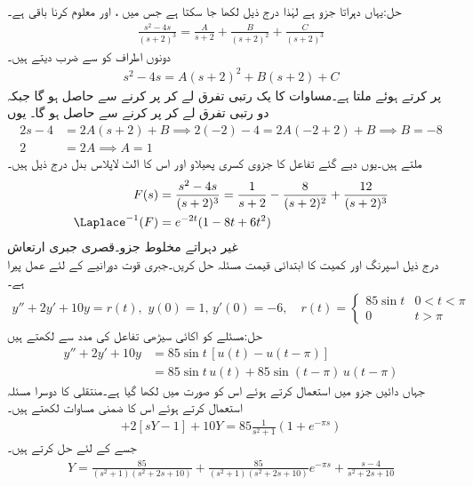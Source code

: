 حل:یہاں  دہراتا جزو ہے لہٰذا درج ذیل لکھا جا سکتا ہے جس میں ،  اور  معلوم کرنا باقی ہے۔
\begin{align*}
\frac{s^2-4s}{(s+2)^3}=\frac{A}{s+2}+\frac{B}{(s+2)^2}+\frac{C}{(s+2)^3}
\end{align*}
دونوں اطراف کو  سے ضرب دیتے ہیں۔
\begin{align*}
s^2-4s=A(s+2)^2+B(s+2)+C
\end{align*}
 پر کرتے ہوئے  ملتا ہے۔مساوات کا یک رتبی تفرق لے کر  پر کرنے سے  حاصل ہو گا جبکہ دو رتبی تفرق لے کر  پر کرنے سے  حاصل ہو گا۔ یوں
\begin{align*}
2s-4&=2A(s+2)+B \implies  2(-2)-4=2A(-2+2)+B \implies  B=-8\\
2&=2A\implies  A=1
\end{align*}
ملتے ہیں۔یوں دیے گئے تفاعل کا جزوی کسری پھیلاو  اور اس کا الٹ لاپلاس بدل درج ذیل ہیں۔
\begin{align*}
F(s)&=\frac{s^2-4s}{(s+2)^3}=\frac{1}{s+2}-\frac{8}{(s+2)^2}+\frac{12}{(s+2)^3}\\
\Laplace^{-1}(F)&=e^{-2t}(1-8t+6t^2)
\end{align*}
\quad غیر دہراتے مخلوط جزو۔قصری جبری ارتعاش\\
درج ذیل اسپرنگ اور کمیت کا ابتدائی قیمت مسئلہ حل کریں۔جبری قوت  دورانیے کے لئے عمل پیرا ہے۔
\begin{align*}
y''+2y'+10y=r(t), \,\,y(0)=1, \, y'(0)=-6,\quad r(t)=
\begin{cases}
85\sin t & 0<t<\pi\\
0&t>\pi
\end{cases}
\end{align*}
حل:مسئلے کو اکائی سیڑھی تفاعل کی مدد سے لکھتے ہیں
\begin{align*}
y''+2y'+10y&=85 \sin t\, [u(t)-u(t-\pi)] \\
&=85 \sin t \,u(t)+85\sin(t-\pi)\, u(t-\pi)
\end{align*}
جہاں دائیں جزو میں  استعمال کرتے ہوئے اس کو  صورت میں لکھا گیا ہے۔منتقلی کا دوسرا مسئلہ استعمال کرتے ہوئے اس کا ضمنی مساوات لکھتے ہیں۔
\begin{align*}
[s^2Y-s(1)+6]+2[sY-1]+10Y=85\frac{1}{s^2+1}(1+e^{-\pi s})
\end{align*}
جسے   کے لئے حل کرتے ہیں۔
\begin{align}\label{مساوات_مثال_لاپلاس_نصف_لہر_الف}
Y=\frac{85}{(s^2+1)(s^2+2s+10)}+\frac{85}{(s^2+1)(s^2+2s+10)}e^{-\pi s}+\frac{s-4}{s^2+2s+10}
\end{align}
